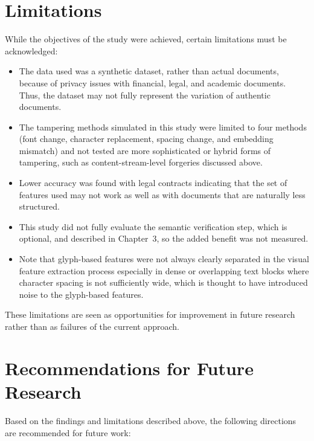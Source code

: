 \section{Limitations}
\label{sec:limitations}

While the objectives of the study were achieved, certain limitations must be acknowledged:

\begin{itemize}
    \item The data used was a synthetic dataset, rather than actual documents, because of privacy issues with financial, legal, and academic documents. Thus, the dataset may not fully represent the variation of authentic documents.
    \item The tampering methods simulated in this study were limited to four methods (font change, character replacement, spacing change, and embedding mismatch) and not tested are more sophisticated or hybrid forms of tampering, such as content-stream-level forgeries discussed above.
    \item Lower accuracy was found with legal contracts indicating that the set of features used may not work as well as with documents that are naturally less structured.
    \item This study did not fully evaluate the semantic verification step, which is optional, and described in Chapter~3, so the added benefit was not measured.
    \item Note that glyph-based features were not always clearly separated in the visual feature extraction process especially in dense or overlapping text blocks where character spacing is not sufficiently wide, which is thought to have introduced noise to the glyph-based features.
\end{itemize}

\noindent These limitations are seen as opportunities for improvement in future research rather than as failures of the current approach.

\section{Recommendations for Future Research}

Based on the findings and limitations described above, the following directions are recommended for future work:

